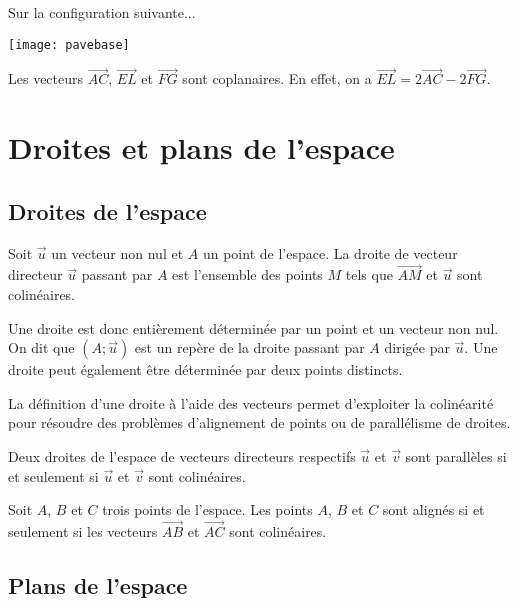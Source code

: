 \documentclass[11pt,fleqn, openany]{book} %
\begin{document}
\begin{example} Sur la configuration suivante...

\begin{center}
\texttt{[image: pavebase]}
\end{center}

Les vecteurs $\overrightarrow{AC}$, $\overrightarrow{EL}$ et $\overrightarrow{FG}$ sont coplanaires. En effet, on a $\overrightarrow{EL}=2\overrightarrow{AC}-2\overrightarrow{FG}$.\end{example}


\section{Droites et plans de l'espace}

\subsection{Droites de l'espace}


\begin{definition} Soit $\vec u$ un vecteur non nul et $A$ un point de l'espace. La droite de vecteur directeur $\vec u$ passant par $A$ est l'ensemble des points $M$ tels que $\overrightarrow{AM}$ et $\vec u$ sont colinéaires.\end{definition}

Une droite est donc entièrement déterminée par un point et un vecteur non nul. On dit que $(A ; \vec u)$ est un repère de la droite passant par $A$ dirigée par $\vec u$. Une droite peut également être déterminée par deux points distincts.

La définition d'une droite à l'aide des vecteurs permet d'exploiter la colinéarité pour résoudre des problèmes d'alignement de points ou de parallélisme de droites.

\begin{proposition}Deux droites de l'espace de vecteurs directeurs respectifs $\vec u$ et $\vec v$ sont parallèles si et seulement si $\vec u$ et $\vec v$ sont colinéaires.\end{proposition}

\begin{proposition}Soit $A$, $B$ et $C$ trois points de l'espace. Les points $A$, $B$ et $C$ sont alignés si et seulement si les vecteurs $\overrightarrow{AB}$ et $\overrightarrow{AC}$ sont colinéaires.\end{proposition}

\subsection{Plans de l'espace}
\end{document}
